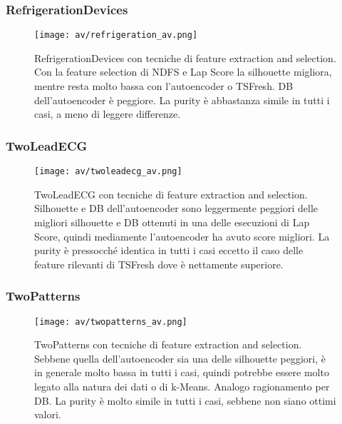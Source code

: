 \subsubsection{RefrigerationDevices}
\begin{figure}[H]
	\centering
	\texttt{[image: av/refrigeration\_av.png]}
	\caption{RefrigerationDevices con tecniche di feature extraction and selection. Con la feature selection di NDFS e Lap Score la silhouette migliora, mentre resta molto bassa con l'autoencoder o TSFresh. DB dell'autoencoder è peggiore. La purity è abbastanza simile in tutti i casi, a meno di leggere differenze.}
	\label{fig:refrigeration_av}
\end{figure}

\subsubsection{TwoLeadECG}
\begin{figure}[H]
	\centering
	\texttt{[image: av/twoleadecg\_av.png]}
	\caption{TwoLeadECG con tecniche di feature extraction and selection. Silhouette e DB dell'autoencoder sono leggermente peggiori delle migliori silhouette e DB ottenuti in una delle esecuzioni di Lap Score, quindi mediamente l'autoencoder ha avuto score migliori. La purity è pressocché identica in tutti i casi eccetto il caso delle feature rilevanti di TSFresh dove è nettamente superiore.}
	\label{fig:twoleadecg_av}
\end{figure}

\subsubsection{TwoPatterns}
\begin{figure}[H]
	\centering
	\texttt{[image: av/twopatterns\_av.png]}
	\caption{TwoPatterns con tecniche di feature extraction and selection. Sebbene quella dell'autoencoder sia una delle silhouette peggiori, è in generale molto bassa in tutti i casi, quindi potrebbe essere molto legato alla natura dei dati o di k-Means. Analogo ragionamento per DB. La purity è molto simile in tutti i casi, sebbene non siano ottimi valori.}
	\label{fig:twopatterns_av}
\end{figure}